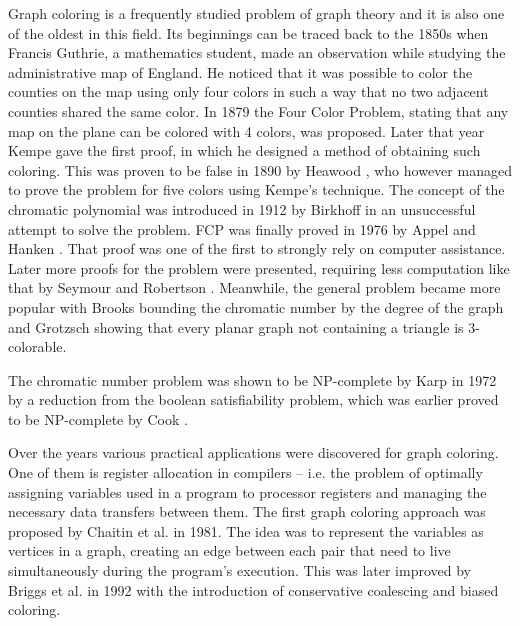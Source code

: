Graph coloring is a frequently studied problem of graph theory and it is also one of the oldest in this field. Its beginnings can be traced back to the 1850s when Francis Guthrie, a mathematics student, made an observation while studying the administrative map of England. He noticed that it was possible to color the counties on the map using only four colors in such a way that no two adjacent counties shared the same color. In 1879 the Four Color Problem, stating that any map on the plane can be colored with 4 colors, was proposed. Later that year 
Kempe \cite{kempe1879geographical}
gave the first proof, in which he designed a method of obtaining such coloring. This was proven to be false in 1890 by 
Heawood \cite{heawood1890map},
who however managed to prove the problem for five colors using Kempe's technique.
The concept of the chromatic polynomial was introduced in 1912 by
Birkhoff \cite{birkhoff1912determinant}
in an unsuccessful attempt to solve the problem.
FCP was finally proved in 1976 by 
Appel and Hanken \cite{appel1976every}
. That proof was one of the first to strongly rely on computer assistance. Later more proofs for the problem were presented, requiring less computation like that by
Seymour and Robertson \cite{robertson1996efficiently}.
Meanwhile, the general problem became more popular with 
Brooks \cite{brooks1941colouring}
bounding the chromatic number by the degree of the graph and
Grotzsch \cite{grotzsch1959dreifarbensatz}
showing that every planar graph not containing a triangle is 3-colorable.

The chromatic number problem was shown to be NP-complete by 
Karp \cite{karp2010reducibility}
in 1972 by a reduction from the boolean satisfiability problem, which was earlier proved to be NP-complete by 
Cook \cite{cook1971complexity}
.

Over the years various practical applications were discovered for graph coloring. One of them is register allocation in compilers -- i.e. the problem of optimally assigning variables used in a program to processor registers and managing the necessary data transfers between them. The first graph coloring approach was proposed by
Chaitin et al. \cite{chaitin1981register}
in 1981. The idea was to represent the variables as vertices in a graph, creating an edge between each pair that need to live simultaneously during the program's execution. This was later improved by
Briggs et al. \cite{briggs1994improvements}
in 1992 with the introduction of conservative coalescing and biased coloring.

